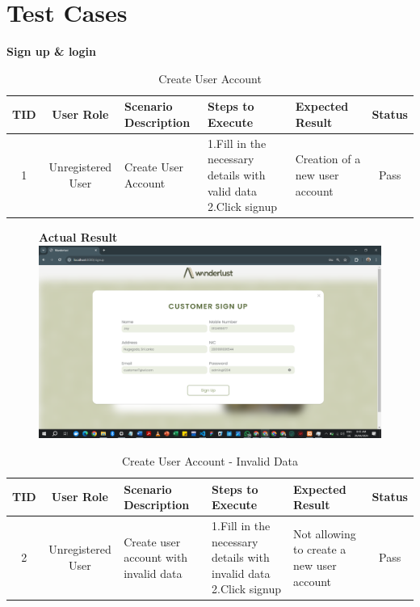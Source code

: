 \section{Test Cases}


\textbf{Sign up \& login}\\

\begin{table}[ht]
\centering
\begin{tabularx}{\textwidth}{|c|c|X|X|X|c|}
\hline
\textbf{TID} & \textbf{User Role} & \textbf{Scenario Description} & \textbf{Steps to Execute} & \textbf{Expected Result} & \textbf{Status} \\ \hline
1 & Unregistered User & Create User Account & 1.Fill in the necessary details with valid data \newline 2.Click signup & Creation of a new user account & Pass \\ \hline
\end{tabularx}
\caption{Create User Account}
\end{table}

\begin{figure}[h!]
    \centering
    \textbf{Actual Result}
    \includegraphics[width=1\textwidth]{Images/Test Cases/1.acc create cus.png}
\end{figure}



\begin{table}[ht]
\centering
\begin{tabularx}{\textwidth}{|c|c|X|X|X|c|}
\hline
\textbf{TID} & \textbf{User Role} & \textbf{Scenario Description} & \textbf{Steps to Execute} & \textbf{Expected Result} & \textbf{Status} \\ \hline
2 & Unregistered User & Create user account with invalid data & 1.Fill in the necessary details with invalid data \newline 2.Click signup & Not allowing to create a new user account & Pass \\ \hline
\end{tabularx}
\caption{Create User Account - Invalid Data}
\end{table}

